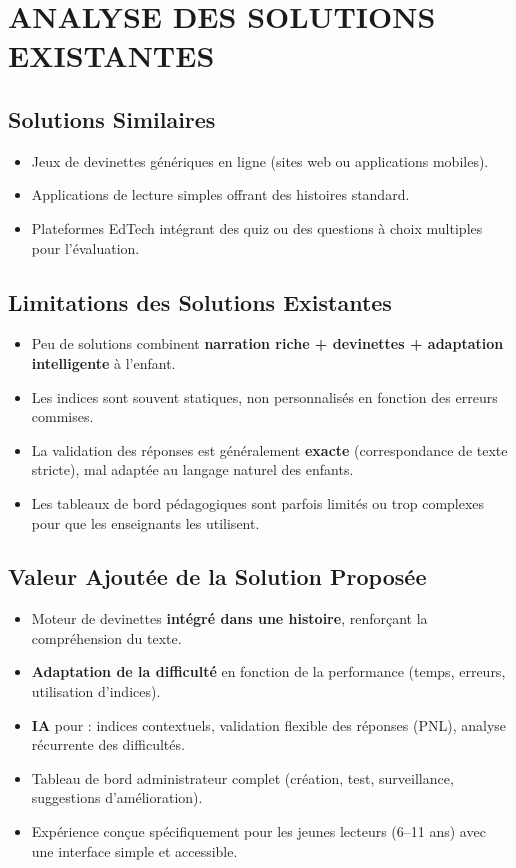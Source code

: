 \documentclass[12pt,a4paper]{article}
\begin{document}
\section{ANALYSE DES SOLUTIONS EXISTANTES}

\subsection{Solutions Similaires}

\begin{itemize}
    \item Jeux de devinettes génériques en ligne (sites web ou applications mobiles).
    \item Applications de lecture simples offrant des histoires standard.
    \item Plateformes EdTech intégrant des quiz ou des questions à choix multiples pour l'évaluation.
\end{itemize}

\subsection{Limitations des Solutions Existantes}

\begin{itemize}
    \item Peu de solutions combinent \textbf{narration riche + devinettes + adaptation intelligente} à l'enfant.
    \item Les indices sont souvent statiques, non personnalisés en fonction des erreurs commises.
    \item La validation des réponses est généralement \textbf{exacte} (correspondance de texte stricte), mal adaptée au langage naturel des enfants.
    \item Les tableaux de bord pédagogiques sont parfois limités ou trop complexes pour que les enseignants les utilisent.
\end{itemize}

\subsection{Valeur Ajoutée de la Solution Proposée}

\begin{itemize}
    \item Moteur de devinettes \textbf{intégré dans une histoire}, renforçant la compréhension du texte.
    \item \textbf{Adaptation de la difficulté} en fonction de la performance (temps, erreurs, utilisation d'indices).
    \item \textbf{IA} pour : indices contextuels, validation flexible des réponses (PNL), analyse récurrente des difficultés.
    \item Tableau de bord administrateur complet (création, test, surveillance, suggestions d'amélioration).
    \item Expérience conçue spécifiquement pour les jeunes lecteurs (6--11 ans) avec une interface simple et accessible.
\end{itemize}
\end{document}
